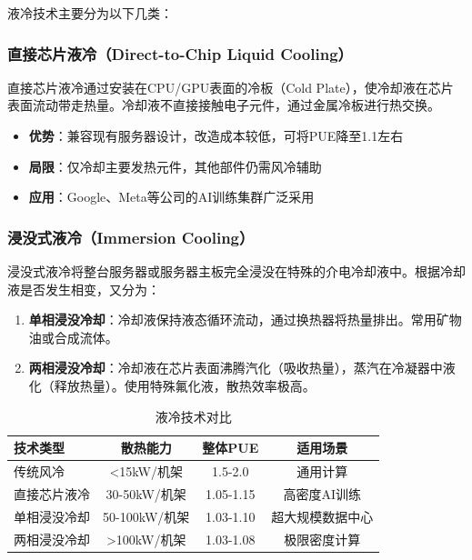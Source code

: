 液冷技术主要分为以下几类：

\subsubsection{直接芯片液冷（Direct-to-Chip Liquid Cooling）}

直接芯片液冷通过安装在CPU/GPU表面的冷板（Cold Plate），使冷却液在芯片表面流动带走热量。冷却液不直接接触电子元件，通过金属冷板进行热交换。

\begin{itemize}
    \item \textbf{优势}：兼容现有服务器设计，改造成本较低，可将PUE降至1.1左右
    \item \textbf{局限}：仅冷却主要发热元件，其他部件仍需风冷辅助
    \item \textbf{应用}：Google、Meta等公司的AI训练集群广泛采用
\end{itemize}

\subsubsection{浸没式液冷（Immersion Cooling）}

浸没式液冷将整台服务器或服务器主板完全浸没在特殊的介电冷却液中。根据冷却液是否发生相变，又分为：

\begin{enumerate}
    \item \textbf{单相浸没冷却}：冷却液保持液态循环流动，通过换热器将热量排出。常用矿物油或合成流体。
    \item \textbf{两相浸没冷却}：冷却液在芯片表面沸腾汽化（吸收热量），蒸汽在冷凝器中液化（释放热量）。使用特殊氟化液，散热效率极高。
\end{enumerate}

\begin{table}[htbp]
\centering
\caption{液冷技术对比}
\begin{tabular}{lccc}
\toprule
\textbf{技术类型} & \textbf{散热能力} & \textbf{整体PUE} & \textbf{适用场景} \\
\midrule
传统风冷 & <15kW/机架 & 1.5-2.0 & 通用计算 \\
直接芯片液冷 & 30-50kW/机架 & 1.05-1.15 & 高密度AI训练 \\
单相浸没冷却 & 50-100kW/机架 & 1.03-1.10 & 超大规模数据中心 \\
两相浸没冷却 & >100kW/机架 & 1.03-1.08 & 极限密度计算 \\
\bottomrule
\end{tabular}
\label{tab:liquid-cooling-comparison}
\end{table}

